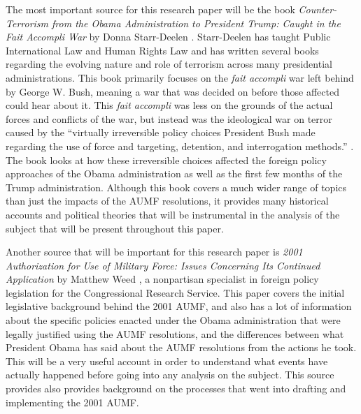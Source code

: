 \documentclass[12pt]{article}
\begin{document}
The most important source for this research paper will be the book \textit{Counter-Terrorism from the Obama Administration to President Trump: Caught in the Fait Accompli War} by Donna Starr-Deelen \autocite{starr-deelen2018}.
Starr-Deelen has taught Public International Law and Human Rights Law and has written several books regarding the evolving nature and role of terrorism across many presidential administrations.
This book primarily focuses on the \textit{fait accompli} war left behind by George W. Bush, meaning a war that was decided on before those affected could hear about it.
This \textit{fait accompli} was less on the grounds of the actual forces and conflicts of the war, but instead was the ideological war on terror caused by the ``virtually irreversible policy choices President Bush made regarding the use of force and targeting, detention, and interrogation methods.'' \autocite[2]{starr-deelen2018}.
The book looks at how these irreversible choices affected the foreign policy approaches of the Obama administration as well as the first few months of the Trump administration.
Although this book covers a much wider range of topics than just the impacts of the AUMF resolutions, it provides many historical accounts and political theories that will be instrumental in the analysis of the subject that will be present throughout this paper.

Another source that will be important for this research paper is \textit{2001 Authorization for Use of Military Force: Issues Concerning Its Continued Application} by Matthew Weed \autocite{weed2015}, a nonpartisan specialist in foreign policy legislation for the Congressional Research Service.
This paper covers the initial legislative background behind the 2001 AUMF, and also has a lot of information about the specific policies enacted under the Obama administration that were legally justified using the AUMF resolutions, and the differences between what President Obama has said about the AUMF resolutions from the actions he took.
This will be a very useful account in order to understand what events have actually happened before going into any analysis on the subject.
This source provides also provides background on the processes that went into drafting and implementing the 2001 AUMF\@.
\end{document}
